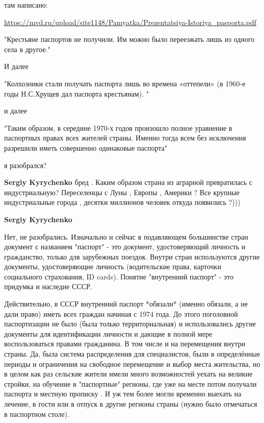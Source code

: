 \begin{itemize}
\begin{itemize}
там написано:

\url{https://mvd.ru/upload/site1148/Pamyatka/Prezentatsiya-Istoriya_pasporta.pdf}

"Крестьяне паспортов не получили. Им можно
было переезжать лишь из одного села в другое."

И далее

"Колхозники стали получать паспорта
лишь во времена «оттепели» (в 1960-е
годы Н.С.Хрущев дал паспорта
крестьянам). "

и далее

"Таким образом, в середине 1970-х годов произошло полное
уравнение в паспортных правах всех жителей страны. Именно тогда
всем без исключения разрешили иметь совершенно одинаковые
паспорта"

я разобрался?

 
\textbf{Sergiy Kyrychenko} бред . Каким образом страна из аграрной превратилась с индустриальную? Переселенцы с Луны , Европы , Америки ? Все крупные индустриальные города , десятки миллионов человек откуда появились ?)))

 
\textbf{Sergiy Kyrychenko} 

Нет, не разобрались. Изначально и сейчас в подавляющем большинстве стран
документ с названием "паспорт" - это документ, удостоверяющий личность и
гражданство, только для зарубежных поездок. Внутри стран используются другие
документы, удостоверяющие личность (водительские права, карточки социального
страхования, ID cards). Понятие "внутренний паспорт" - это придумка и наследие
СССР.

Действительно, в СССР внутренний паспорт *обязали* (именно обязали, а не дали
право) иметь всех граждан начиная с 1974 года. До этого поголовной
паспортизации не было (была только территориальная) и использовались другие
документы для идентификации личности и дающие в полной мере воспользоваться
правами гражданина. В том числе и на перемещения внутри страны. Да, была
система распределения для специалистов, были в определённые периоды и
ограничения на свободное перемещение и выбор места жительства, но в целом как
раз сельские жители имели много возможностей уехать на великие стройки, на
обучение в "паспортные" регионы, где уже на месте потом получали паспорта и
местную прописку . И уж тем более могли временно выехать на лечение, в гости
или в отпуск в другие регионы страны (нужно было отмечаться в паспортном
столе).


\end{itemize}
\end{itemize}
